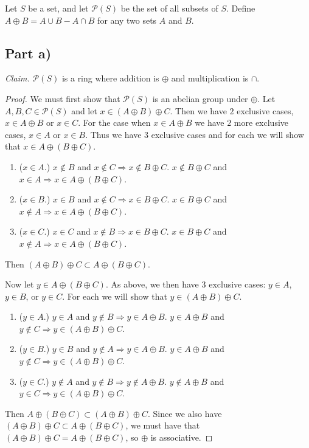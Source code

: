 \documentclass{abrice}
\renewcommand{\P}{\mathscr{P}}
\begin{document}
Let $S$ be a set, and let $\P(S)$ be the set of all subsets of $S$. Define $A
\oplus B = A \cup B - A \cap B$ for any two sets $A$ and $B$.

\subsection{Part a)}

\emph{Claim.} $\P(S)$ is a ring where addition is $\oplus$ and multiplication
is $\cap$.

\begin{proof}
  We must first show that $\P(S)$ is an abelian group under $\oplus$. Let $A, B,
  C \in \P(S)$ and let $x \in (A \oplus B) \oplus C$. Then we have $2$ exclusive
  cases, $x \in A \oplus B$ or $x \in C$. For the case when $x \in A \oplus B$
  we have $2$ more exclusive cases, $x \in A$ or $x \in B$. Thus we have $3$
  exclusive cases and for each we will show that $x \in A \oplus (B \oplus C)$.
  \begin{enumerate}[label=\emph{\roman*})]
  \item ($x \in A$.) $x \notin B$ and $x \notin C \Rightarrow x \notin B \oplus
    C$. $x \notin B \oplus C$ and $x \in A \Rightarrow x \in A \oplus (B \oplus
    C)$.
  \item ($x \in B$.) $x \in B$ and $x \notin C \Rightarrow x \in B \oplus C$. $x
    \in B \oplus C$ and $x \notin A \Rightarrow x \in A \oplus (B \oplus C)$.
  \item ($x \in C$.) $x \in C$ and $x \notin B \Rightarrow x \in B \oplus C$.
    $x \in B \oplus C$ and $x \notin A \Rightarrow x \in A \oplus (B \oplus C)$.
  \end{enumerate}
  Then $(A \oplus B) \oplus C \subset A \oplus (B \oplus C)$.

  Now let $y \in A \oplus (B \oplus C)$. As above, we then have $3$ exclusive
  cases: $y \in A$, $y \in B$, or $y \in C$. For each we will show that $y \in
  (A \oplus B) \oplus C$.
  \begin{enumerate}[label=\emph{\roman*})]
  \item ($y \in A$.) $y \in A$ and $y \notin B \Rightarrow y \in A \oplus B$. $y
    \in A \oplus B$ and $y \notin C \Rightarrow y \in (A \oplus B) \oplus C$.
  \item ($y \in B$.) $y \in B$ and $y \notin A \Rightarrow y \in A \oplus B$. $y
    \in A \oplus B$ and $y \notin C \Rightarrow y \in (A \oplus B) \oplus C$.
  \item ($y \in C$.) $y \notin A$ and $y \notin B \Rightarrow y \notin A \oplus
    B$. $y \notin A \oplus B$ and $y \in C \Rightarrow y \in (A \oplus B) \oplus
    C$.
  \end{enumerate}
  Then $A \oplus (B \oplus C) \subset (A \oplus B) \oplus C$. Since we also have
  $(A \oplus B) \oplus C \subset A \oplus (B \oplus C)$, we must have that $(A
  \oplus B) \oplus C = A \oplus (B \oplus C)$, so $\oplus$ is associative.


\end{proof}
\end{document}
